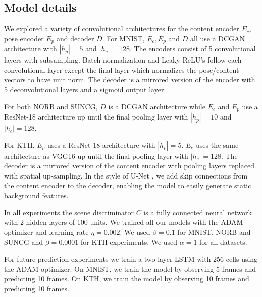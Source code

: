 \documentclass{article}
\newcommand{\emily}[1]{\textbf{\textcolor{green}{#1}}}
\begin{document}
\subsection{Model details}\label{sec:model_details}
We explored a variety of convolutional
architectures for the content encoder $E_c$, pose encoder $E_p$ and
decoder $D$.  For MNIST, $E_c,E_p$ and $D$ all use a DCGAN
 architecture \cite{radford2016} with $\left\vert{h_p}\right\vert = 5$
and $\left\vert{h_c}\right\vert = 128$.  The encoders consist of 5
convolutional layers with subsampling. Batch normalization and Leaky
ReLU's follow each convolutional layer except the final layer which 
normalizes the pose/content vectors to have unit norm.  The decoder is
a mirrored version of the encoder with 5 deconvolutional layers and a sigmoid output layer.

For both NORB and SUNCG, $D$ is a DCGAN architecture while $E_c$ and
$E_p$ use a ResNet-18 architecture \cite{resnet} up until the final pooling layer with  $\left\vert{h_p}\right\vert = 10$ and  $\left\vert{h_c}\right\vert = 128$.

For KTH, $E_p$ uses a ResNet-18 architecture with
$\left\vert{h_p}\right\vert = 5$.  $E_c$ uses the same
architecture as VGG16 \cite{vgg} up until the final pooling layer with
$\left\vert{h_c}\right\vert = 128$. The decoder is a mirrored
version of the content encoder with pooling layers replaced with
spatial up-sampling. In the style of U-Net \cite{ronneberger2015u}, we add skip connections from the content encoder
to the decoder, enabling the model to easily generate static
background features.  

In all experiments the scene discriminator $C$ is a fully connected
neural network with 2 hidden layers of 100 units.  We trained all our
models with the ADAM optimizer \cite{Kingma2015} and learning rate
$\eta=0.002$. We used $\beta = 0.1$ for MNIST, NORB and SUNCG and $\beta = 0.0001$ for KTH experiments.
We used $\alpha = 1$ for all datasets.

For future prediction experiments we train a two layer LSTM with 256
cells using the ADAM optimizer.  On MNIST, we train the model by
observing 5 frames and predicting 10 frames.  On KTH, we train the
model by observing 10 frames and predicting 10 frames.
\end{document}
